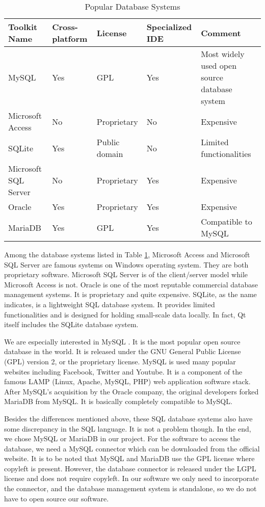 \begin{table}[htb]
\centering
\caption {Popular Database Systems\label{tab:Popular Database Systems}} 
\begin{tabular}{p{}p{}p{}p{}p{}}
\hline
Toolkit Name & Cross-platform & License & Specialized IDE &  Comment\\
\hline
MySQL & Yes & GPL & Yes & Most widely used open \newline source database system \\
Microsoft \newline Access & No & Proprietary & No & Expensive \\
SQLite & Yes & Public \newline domain & No & Limited functionalities \\
Microsoft \newline SQL Server & No & Proprietary & Yes & Expensive \\
Oracle & Yes & Proprietary & Yes & Expensive \\
MariaDB & Yes & GPL & Yes & Compatible to MySQL \\
\hline
\end{tabular}
\end{table}

Among the database systems listed in Table \ref{tab:Popular Database Systems}, Microsoft Access and Microsoft SQL Server are famous systems on Windows operating system. They are both proprietary software. Microsoft SQL Server is of the client/server model while Microsoft Access is not. Oracle is one of the most reputable commercial database management systems. It is proprietary and quite expensive. SQLite, as the name indicates, is a lightweight SQL database system. It provides limited functionalities and is designed for holding small-scale data locally. In fact, Qt itself includes the SQLite database system. 

We are especially interested in MySQL \cite{mysql}. It is the most popular open source database in the world. It is released under the GNU General Public License (GPL) version 2, or the proprietary license. MySQL is used many popular websites including Facebook, Twitter and Youtube. It is a component of the famous LAMP (Linux, Apache, MySQL, PHP) web application software stack. After MySQL's acquisition by the Oracle company, the original developers forked MariaDB \cite{mariadb} from MySQL. It is basically completely compatible to MySQL.

Besides the differences mentioned above, these SQL database systems also have some discrepancy in the SQL language. It is not a problem though. In the end, we chose MySQL or MariaDB in our project. For the software to access the database, we need a MySQL connector which can be downloaded from the official website. It is to be noted that MySQL and MariaDB use the GPL license where copyleft is present. However, the database connector is released under the LGPL license and does not require copyleft. In our software we only need to incorporate the connector, and the database management system is standalone, so we do not have to open source our software.